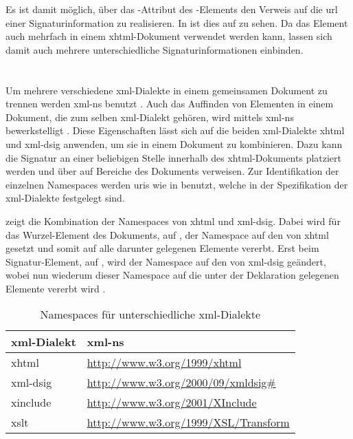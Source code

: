 Es ist damit möglich, über das -Attribut des -Elements den Verweis auf die \gls{url} einer Signaturinformation zu realisieren. In
 ist dies auf  zu sehen. Da das
Element auch mehrfach in einem \gls{xhtml}-Dokument verwendet werden kann, lassen sich damit auch mehrere unterschiedliche Signaturinformationen einbinden.



\section{}
\label{sec:Signaturbindung:XML-NS}
Um mehrere verschiedene \gls{xml}-Dialekte in einem gemeinsamen Dokument zu trennen werden \gls{xml-ns} benutzt \cite{xml-ns:w3c}. Auch das Auffinden von
Elementen in einem Dokument, die zum selben \gls{xml}-Dialekt gehören, wird mittels \gls{xml-ns} bewerkstelligt \cite{xml:oreilly}. Diese Eigenschaften lässt
sich auf die beiden \gls{xml}-Dialekte \gls{xhtml} und \gls{xml-dsig} anwenden, um sie in einem Dokument zu kombinieren. Dazu kann die Signatur an einer
beliebigen Stelle innerhalb des \gls{xhtml}-Dokuments platziert werden und über  auf Bereiche des Dokuments verweisen. Zur Identifikation der
einzelnen Namespaces werden \glspl{uri} wie in  benutzt, welche in der Spezifikation der \gls{xml}-Dialekte festgelegt sind.

 zeigt die Kombination der Namespaces von \gls{xhtml} und \gls{xml-dsig}. Dabei wird für das Wurzel-Element des Dokuments,  auf
, der Namespace auf den von \gls{xhtml} gesetzt und somit auf alle darunter gelegenen Elemente vererbt. Erst beim Signatur-Element,
 auf , wird der Namespace auf den von \gls{xml-dsig} geändert, wobei nun wiederum dieser Namespace auf die unter
der Deklaration gelegenen Elemente vererbt wird \cite{xml:oreilly}.

\begin{table}
    \centering
    \begin{tabularx}{\textwidth}{ l X }
        \gls{xml}-Dialekt  & \gls{xml-ns} \\
        \hline
        \hline
        \gls{xhtml} & \url{http://www.w3.org/1999/xhtml} \\
        \hline
        \gls{xml-dsig} & \url{http://www.w3.org/2000/09/xmldsig\#} \\
        \hline
        \gls{xinclude} & \url{http://www.w3.org/2001/XInclude} \\
        \hline
        \gls{xslt} & \url{http://www.w3.org/1999/XSL/Transform} \\
        \hline
    \end{tabularx}
    \caption{Namespaces für unterschiedliche \protect\gls{xml}-Dialekte}
    \label{tab:xml-namespaces}
\end{table}

